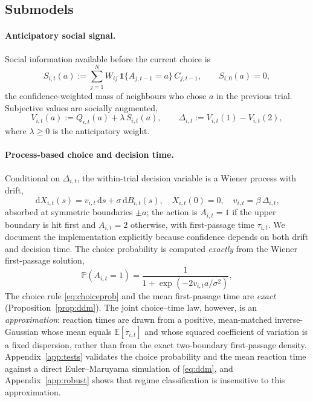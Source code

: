 \documentclass[11pt]{article}
\newcommand{\E}{\mathbb{E}}
\newcommand{\Prob}{\mathbb{P}}
\newcommand{\1}{\mathbf{1}}
\newcommand{\dd}{\,\mathrm{d}}
\begin{document}
\subsection{Submodels}

\paragraph{Anticipatory social signal.}
Social information available before the current choice is
\begin{equation}
S_{i,t}(a):=\sum_{j=1}^N W_{ij}\,\1\{A_{j,t-1}=a\}\,C_{j,t-1},
\qquad S_{i,0}(a)=0,
\label{eq:Si}
\end{equation}
the confidence-weighted mass of neighbours who chose $a$ in the previous trial.
Subjective values are socially augmented,
\begin{equation}
V_{i,t}(a):=Q_{i,t}(a)+\lambda\,S_{i,t}(a),
\qquad
\Delta_{i,t}:=V_{i,t}(1)-V_{i,t}(2),
\label{eq:V}
\end{equation}
where $\lambda\ge 0$ is the anticipatory weight.

\paragraph{Process-based choice and decision time.}
Conditional on $\Delta_{i,t}$, the within-trial decision variable is a Wiener
process with drift,
\begin{equation}
\dd X_{i,t}(s)=v_{i,t}\dd s+\sigma\dd B_{i,t}(s),\quad X_{i,t}(0)=0,\quad
v_{i,t}=\beta\,\Delta_{i,t},
\label{eq:ddm}
\end{equation}
absorbed at symmetric boundaries $\pm a$; the action is $A_{i,t}=1$ if the upper
boundary is hit first and $A_{i,t}=2$ otherwise, with first-passage time
$\tau_{i,t}$. We document the implementation explicitly because confidence
depends on both drift and decision time. The choice probability is computed
\emph{exactly} from the Wiener first-passage solution,
\begin{equation}
\Prob(A_{i,t}=1)=\frac{1}{1+\exp(-2v_{i,t}a/\sigma^2)},
\label{eq:choiceprob}
\end{equation}
The choice rule \eqref{eq:choiceprob} and the mean first-passage time are
\emph{exact} (Proposition~\ref{prop:ddm}). The joint choice--time law, however,
is an \emph{approximation}: reaction times are drawn from a positive,
mean-matched inverse-Gaussian whose mean equals $\E[\tau_{i,t}]$ and whose
squared coefficient of variation is a fixed dispersion, rather than from the
exact two-boundary first-passage density. Appendix~\ref{app:tests} validates the
choice probability and the mean reaction time against a direct Euler--Maruyama
simulation of \eqref{eq:ddm}, and Appendix~\ref{app:robust} shows that regime
classification is insensitive to this approximation.
\end{document}
